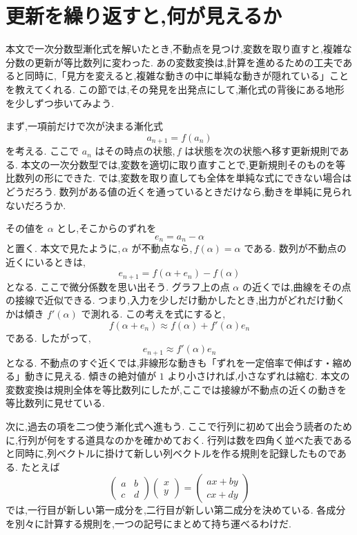 
\section{更新を繰り返すと,何が見えるか}

本文で一次分数型漸化式を解いたとき,不動点を見つけ,変数を取り直すと,複雑な分数の更新が等比数列に変わった.
あの変数変換は,計算を進めるための工夫であると同時に,「見方を変えると,複雑な動きの中に単純な動きが隠れている」ことを教えてくれる.
この節では,その発見を出発点にして,漸化式の背後にある地形を少しずつ歩いてみよう.

まず,一項前だけで次が決まる漸化式
\[
  a_{n+1}=f(a_n)
\]
を考える.
ここで $a_n$ はその時点の状態,\,$f$ は状態を次の状態へ移す更新規則である.
本文の一次分数型では,変数を適切に取り直すことで,更新規則そのものを等比数列の形にできた.
では,変数を取り直しても全体を単純な式にできない場合はどうだろう.
数列がある値の近くを通っているときだけなら,動きを単純に見られないだろうか.

その値を $\alpha$ とし,そこからのずれを
\[
  e_n=a_n-\alpha
\]
と置く.
本文で見たように,\,$\alpha$ が不動点なら,\,$f(\alpha)=\alpha$ である.
数列が不動点の近くにいるときは,
\[
  e_{n+1}=f(\alpha+e_n)-f(\alpha)
\]
となる.
ここで微分係数を思い出そう.
グラフ上の点 $\alpha$ の近くでは,曲線をその点の接線で近似できる.
つまり,入力を少しだけ動かしたとき,出力がどれだけ動くかは傾き $f'(\alpha)$ で測れる.
この考えを式にすると,
\[
  f(\alpha+e_n)\approx f(\alpha)+f'(\alpha)e_n
\]
である.
したがって,
\[
  e_{n+1}\approx f'(\alpha)e_n
\]
となる.
不動点のすぐ近くでは,非線形な動きも「ずれを一定倍率で伸ばす・縮める」動きに見える.
傾きの絶対値が $1$ より小さければ,小さなずれは縮む.
本文の変数変換は規則全体を等比数列にしたが,ここでは接線が不動点の近くの動きを等比数列に見せている.

次に,過去の項を二つ使う漸化式へ進もう.
ここで行列に初めて出会う読者のために,行列が何をする道具なのかを確かめておく.
行列は数を四角く並べた表であると同時に,列ベクトルに掛けて新しい列ベクトルを作る規則を記録したものである.
たとえば
\[
  \begin{pmatrix}a&b\\c&d\end{pmatrix}
  \begin{pmatrix}x\\y\end{pmatrix}
  =
  \begin{pmatrix}ax+by\\cx+dy\end{pmatrix}
\]
では,一行目が新しい第一成分を,二行目が新しい第二成分を決めている.
各成分を別々に計算する規則を,一つの記号にまとめて持ち運べるわけだ.

